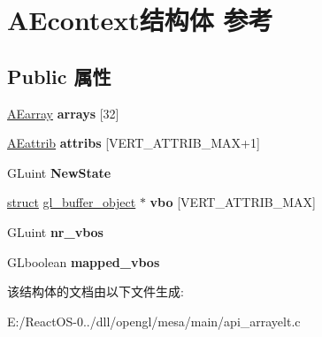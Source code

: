 \hypertarget{struct_a_econtext}{}\section{A\+Econtext结构体 参考}
\label{struct_a_econtext}
\subsection*{Public 属性}
\begin{DoxyCompactItemize}
\item 
\mbox{\label{struct_a_econtext_af80eef2b02a28463493948c26ba12b09}} 
\hyperlink{struct_a_earray}{A\+Earray} {\bfseries arrays} \mbox{[}32\mbox{]}
\item 
\mbox{\label{struct_a_econtext_a0a62302ef5f24848733498b3f521a0ef}} 
\hyperlink{struct_a_eattrib}{A\+Eattrib} {\bfseries attribs} \mbox{[}V\+E\+R\+T\+\_\+\+A\+T\+T\+R\+I\+B\+\_\+\+M\+AX+1\mbox{]}
\item 
\mbox{\label{struct_a_econtext_a93ecdc287bad269f97f9276713e7e123}} 
G\+Luint {\bfseries New\+State}
\item 
\mbox{\label{struct_a_econtext_a5435791147a79173cee60d27f4c69bbe}} 
\hyperlink{interfacestruct}{struct} \hyperlink{structgl__buffer__object}{gl\+\_\+buffer\+\_\+object} $\ast$ {\bfseries vbo} \mbox{[}V\+E\+R\+T\+\_\+\+A\+T\+T\+R\+I\+B\+\_\+\+M\+AX\mbox{]}
\item 
\mbox{\label{struct_a_econtext_ad5654a5332c6f483d79e0fcf3292854a}} 
G\+Luint {\bfseries nr\+\_\+vbos}
\item 
\mbox{\label{struct_a_econtext_a8cfd16d0a8c9a09820038e5dbb81fc67}} 
G\+Lboolean {\bfseries mapped\+\_\+vbos}
\end{DoxyCompactItemize}


该结构体的文档由以下文件生成\+:\begin{DoxyCompactItemize}
\item 
E\+:/\+React\+O\+S-\/0../dll/opengl/mesa/main/api\+\_\+arrayelt.\+c\end{DoxyCompactItemize}
